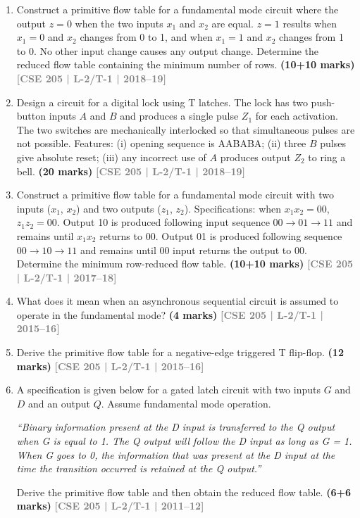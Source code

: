\documentclass[12pt]{article}
\newcommand{\yr}[1]{\hfill\textcolor{gray}{\small\textbf{[#1]}}}
\newcommand{\mk}[1]{\textcolor{orange!70!black}{\small\textbf{(#1 marks)}}}
\begin{document}
\begin{enumerate}
\item Construct a primitive flow table for a fundamental mode circuit where the output $z=0$ when the two inputs $x_1$ and $x_2$ are equal. $z=1$ results when $x_1=0$ and $x_2$ changes from 0 to 1, and when $x_1=1$ and $x_2$ changes from 1 to 0. No other input change causes any output change. Determine the reduced flow table containing the minimum number of rows.
\mk{10+10} \yr{CSE 205 | L-2/T-1 | 2018--19}

\item Design a circuit for a digital lock using T latches. The lock has two push-button inputs $A$ and $B$ and produces a single pulse $Z_1$ for each activation. The two switches are mechanically interlocked so that simultaneous pulses are not possible. Features: (i) opening sequence is AABABA; (ii) three $B$ pulses give absolute reset; (iii) any incorrect use of $A$ produces output $Z_2$ to ring a bell.
\mk{20} \yr{CSE 205 | L-2/T-1 | 2018--19}



\item Construct a primitive flow table for a fundamental mode circuit with two inputs ($x_1$, $x_2$) and two outputs ($z_1$, $z_2$). Specifications: when $x_1x_2=00$, $z_1z_2=00$. Output 10 is produced following input sequence $00\to01\to11$ and remains until $x_1x_2$ returns to 00. Output 01 is produced following sequence $00\to10\to11$ and remains until 00 input returns the output to 00. Determine the minimum row-reduced flow table.
\mk{10+10} \yr{CSE 205 | L-2/T-1 | 2017--18}

\item What does it mean when an asynchronous sequential circuit is assumed to operate in the fundamental mode?
\mk{4} \yr{CSE 205 | L-2/T-1 | 2015--16}

\item Derive the primitive flow table for a negative-edge triggered T flip-flop.
\mk{12} \yr{CSE 205 | L-2/T-1 | 2015--16}

\item A specification is given below for a gated latch circuit with two inputs $G$ and $D$ and an output $Q$. Assume fundamental mode operation.

\textit{``Binary information present at the D input is transferred to the Q output when G is equal to 1. The Q output will follow the D input as long as G = 1. When G goes to 0, the information that was present at the D input at the time the transition occurred is retained at the Q output.''}

Derive the primitive flow table and then obtain the reduced flow table.
\mk{6+6} \yr{CSE 205 | L-2/T-1 | 2011--12}

\end{enumerate}
\end{document}
